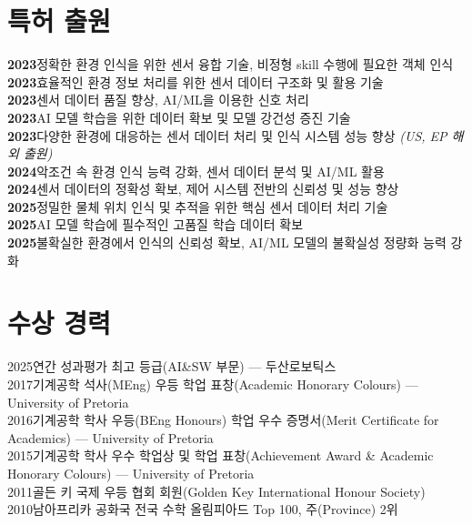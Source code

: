 \documentclass[a4paper,11pt]{article}
\begin{document}
\section{특허 출원 }
 \begin{itemize}[leftmargin=0.15in, label={}]
    \small{\item{
      \textbf{2023}\enspace 정확한 환경 인식을 위한 센서 융합 기술, 비정형 skill 수행에 필요한 객체 인식 \\
      \textbf{2023}\enspace 효율적인 환경 정보 처리를 위한 센서 데이터 구조화 및 활용 기술 \\
      \textbf{2023}\enspace 센서 데이터 품질 향상, AI/ML을 이용한 신호 처리 \\
      \textbf{2023}\enspace AI 모델 학습을 위한 데이터 확보 및 모델 강건성 증진 기술 \\
      \textbf{2023}\enspace 다양한 환경에 대응하는 센서 데이터 처리 및 인식 시스템 성능 향상 \textit{(US, EP 해외 출원)} \\
      \textbf{2024}\enspace 악조건 속 환경 인식 능력 강화, 센서 데이터 분석 및 AI/ML 활용 \\
      \textbf{2024}\enspace 센서 데이터의 정확성 확보, 제어 시스템 전반의 신뢰성 및 성능 향상 \\
      \textbf{2025}\enspace 정밀한 물체 위치 인식 및 추적을 위한 핵심 센서 데이터 처리 기술 \\
      \textbf{2025}\enspace AI 모델 학습에 필수적인 고품질 학습 데이터 확보 \\
      \textbf{2025}\enspace 불확실한 환경에서 인식의 신뢰성 확보, AI/ML 모델의 불확실성 정량화 능력 강화
    }}
 \end{itemize}

\section{수상 경력}
 \begin{itemize}[leftmargin=0.15in, label={}]
    \small{\item{
      2025\enspace 연간 성과평가 최고 등급(AI\&SW 부문) --- 두산로보틱스 \\
      2017\enspace 기계공학 석사(MEng) 우등 학업 표창(Academic Honorary Colours) --- University of Pretoria \\
      2016\enspace 기계공학 학사 우등(BEng Honours) 학업 우수 증명서(Merit Certificate for Academics) --- University of Pretoria \\
      2015\enspace 기계공학 학사 우수 학업상 및 학업 표창(Achievement Award \& Academic Honorary Colours) --- University of Pretoria \\
      2011\enspace 골든 키 국제 우등 협회 회원(Golden Key International Honour Society) \\
      2010\enspace 남아프리카 공화국 전국 수학 올림피아드 Top 100, 주(Province) 2위
    }}
 \end{itemize}

\end{document}
